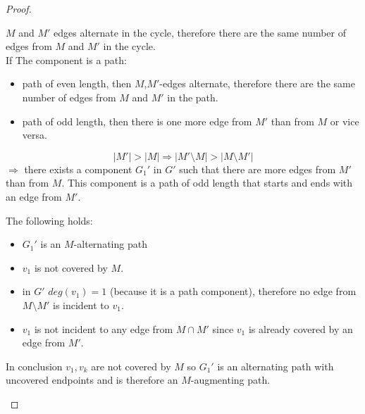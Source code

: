 \documentclass[notitlepage, 12pt]{article}
\begin{document}
\begin{proof}
\begin{itemize}
  $M$ and $M'$ edges alternate in the cycle, therefore there are the same number of edges from $M$ and $M'$ in the cycle.\\
  If The component is a path:
  \begin{itemize}
    \item path of even length, then $M$,$M'$-edges alternate, therefore there are the same number of edges from $M$ and $M'$ in the path.
    \item path of odd length, then there is one more edge from $M'$ than from $M$ or vice versa.
  \end{itemize}
  \[|M'| > |M| \Rightarrow |M' \setminus M| > |M \setminus M'|\]
  $\Rightarrow$ there exists a component $G_1'$ in $G'$ such that there are more
  edges from $M'$ than from $M$. This component is a path of odd length that starts and
  ends with an edge from $M'$.
\begin{center}
  \end{center}

  The following holds:
  \begin{itemize}
    \item $G_1'$ is an $M$-alternating path
    \item $v_1$ is not covered by $M$.
    \item in $G'$ $deg(v_1)=1$ (because it is a path component), therefore no
    edge from $M \setminus M'$ is incident to $v_1$.
    \item $v_1$ is not incident to any edge from $M \cap M'$ since $v_1$ is
    already covered by an edge from $M'$.
  \end{itemize}
  In conclusion $v_1, v_k$ are not covered by $M$ so $G_1'$ is an alternating
  path with uncovered endpoints and is therefore an $M$-augmenting path.
\end{itemize}
\end{proof}
\end{document}
